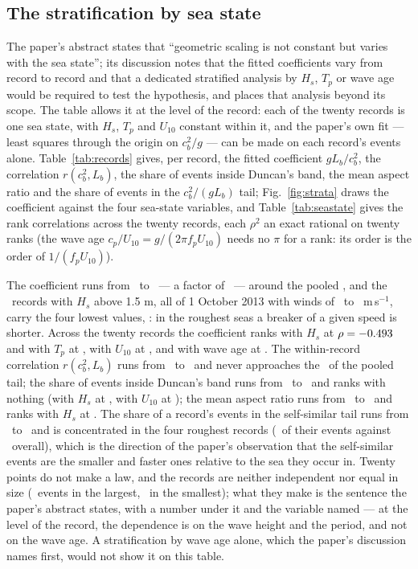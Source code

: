 \documentclass[preprint,11pt,authoryear]{elsarticle}
\begin{document}
\subsection{The stratification by sea state}\label{sec:strata}
The paper's abstract states that ``geometric scaling is not constant but varies with the sea state''; its discussion notes that the fitted coefficients vary from record to record and that a dedicated stratified analysis by $H_s$, $T_p$ or wave age would be required to test the hypothesis, and places that analysis beyond its scope. The table allows it at the level of the record: each of the twenty records is one sea state, with $H_s$, $T_p$ and $U_{10}$ constant within it, and the paper's own fit --- least squares through the origin on $c_b^2/g$ --- can be made on each record's events alone. Table~\ref{tab:records} gives, per record, the fitted coefficient $gL_b/c_b^2$, the correlation $r(c_b^2, L_b)$, the share of events inside Duncan's band, the mean aspect ratio and the share of events in the $c_b^2/(gL_b)$ tail; Fig.~\ref{fig:strata} draws the coefficient against the four sea-state variables, and Table~\ref{tab:seastate} gives the rank correlations across the twenty records, each $\rho^2$ an exact rational on twenty ranks (the wave age $c_p/U_{10} = g/(2\pi f_p U_{10})$ needs no $\pi$ for a rank: its order is the order of $1/(f_p U_{10})$).

The coefficient runs from \SlopeMin\ to \SlopeMax\ --- a factor of \SlopeSpread\ --- around the pooled \PooledSlope, and the \RoughCount\ records with $H_s$ above 1.5 m, all of 1 October 2013 with winds of \RoughULo\ to \RoughUHi\ m\,s$^{-1}$, carry the four lowest values, \RoughSlopes: in the roughest seas a breaker of a given speed is shorter. Across the twenty records the coefficient ranks with $H_s$ at $\rho = -0.493$ and with $T_p$ at \RhoSlopeTp, with $U_{10}$ at \RhoSlopeU, and with wave age at \RhoSlopeAge. The within-record correlation $r(c_b^2, L_b)$ runs from \RecordRLo\ to \RecordRHi\ and never approaches the \TailRSq\ of the pooled tail; the share of events inside Duncan's band runs from \BandShareLo\ to \BandShareHi\ and ranks with nothing (with $H_s$ at \RhoBandHs, with $U_{10}$ at \RhoBandU); the mean aspect ratio runs from \RecordAspectLo\ to \RecordAspectHi\ and ranks with $H_s$ at \RhoAspectHs. The share of a record's events in the self-similar tail runs from \RecordTailLo\ to \RecordTailHi\ and is concentrated in the four roughest records (\RoughTailPcts\ of their events against \TailPctOverall\ overall), which is the direction of the paper's observation that the self-similar events are the smaller and faster ones relative to the sea they occur in. Twenty points do not make a law, and the records are neither independent nor equal in size (\LargestRecordN\ events in the largest, \SmallestRecordN\ in the smallest); what they make is the sentence the paper's abstract states, with a number under it and the variable named --- at the level of the record, the dependence is on the wave height and the period, and not on the wave age. A stratification by wave age alone, which the paper's discussion names first, would not show it on this table.
\end{document}
